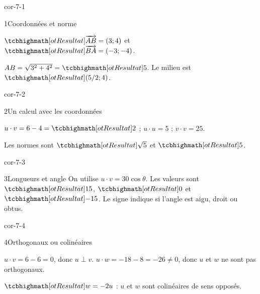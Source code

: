 \corrigesSouples


\begin{blocLivre}{cor-7-1}
\begin{corrige}{1}{Coordonnées et norme}
\begin{questions}
\item $\res{\vect{AB}=(3;4)}$ et $\res{\vect{BA}=(-3;-4)}$.
\item $AB=\sqrt{3^2+4^2}=\res{5}$. Le milieu est $\res{(5/2;4)}$.
\end{questions}

\label{figgeo-07-01-cor}
\end{corrige}
\end{blocLivre}
\begin{blocLivre}{cor-7-2}
\begin{corrige}{2}{Un calcul avec les coordonnées}
\begin{questions}
\item $u\cdot v=6-4=\res{2}$ ; $u\cdot u=5$ ; $v\cdot v=25$.
\item Les normes sont $\res{\sqrt5}$ et $\res{5}$.
\end{questions}

\label{figgeo-07-02-cor}
\end{corrige}
\end{blocLivre}
\begin{blocLivre}{cor-7-3}
\begin{corrige}{3}{Longueurs et angle}
On utilise $u\cdot v=30\cos\theta$. Les valeurs sont $\res{15}$, $\res{0}$ et $\res{-15}$. Le signe indique si l’angle est aigu, droit ou obtus.
\label{figgeo-07-03-cor}
\end{corrige}
\end{blocLivre}
\begin{blocLivre}{cor-7-4}
\begin{corrige}{4}{Orthogonaux ou colinéaires}
\begin{questions}
\item $u\cdot v=6-6=0$, donc $u\perp v$. $u\cdot w=-18-8=-26\neq0$, donc $u$ et $w$ ne sont pas orthogonaux.
\item $\res{w=-2u}$ : $u$ et $w$ sont colinéaires de sens opposés.
\end{questions}

\label{figgeo-07-04-cor}
\end{corrige}
\end{blocLivre}
